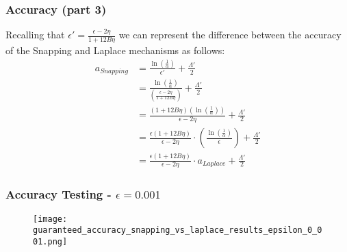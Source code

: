 \documentclass{beamer}
\begin{document}
\begin{frame}[shrink=20]
    \frametitle{Accuracy (part 3)}
    Recalling that
$\epsilon' = \frac{\epsilon - 2\eta}{1 + 12B\eta}$ we can represent the difference between the accuracy of the
Snapping and Laplace mechanisms as follows:
    \begin{align*}
        a_{Snapping} &= \frac{\ln \left( \frac{1}{\alpha} \right)}{\epsilon'} + \frac{\Lambda'}{2} \\
                     &= \frac{\ln \left( \frac{1}{\alpha} \right)}{\left( \frac{\epsilon - 2\eta}{1 + 12B\eta} \right)} + \frac{\Lambda'}{2} \\
                     &= \frac{(1 + 12B \eta) \left(\ln \left( \frac{1}{\alpha} \right) \right)}{\epsilon - 2\eta} + \frac{\Lambda'}{2} \\
                     &= \frac{\epsilon(1 + 12B \eta)}{\epsilon - 2\eta } \cdot \left(\frac{\ln \left( \frac{1}{\alpha} \right)}{\epsilon} \right) + \frac{\Lambda'}{2} \\
                     &= \frac{\epsilon(1 + 12B \eta)}{\epsilon - 2\eta} \cdot a_{Laplace} + \frac{\Lambda'}{2}
    \end{align*}
\end{frame}

\begin{frame}
    \frametitle{Accuracy Testing - $\epsilon = 0.001$}
    \begin{figure}
        \texttt{[image: guaranteed\_accuracy\_snapping\_vs\_laplace\_results\_epsilon\_0\_001.png]}
    \end{figure}
\end{frame}
\end{document}
